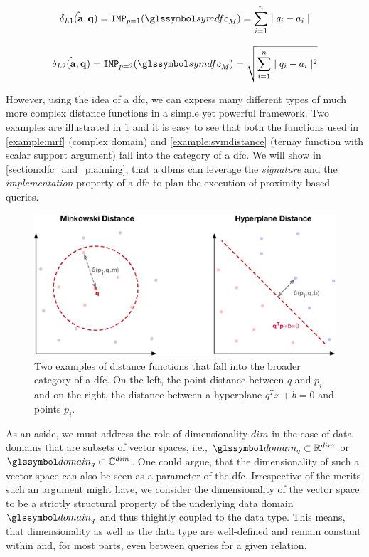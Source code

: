 \begin{equation}
    \hat{\delta_{L1}(\mathbf{a},\mathbf{q})} = \texttt{IMP}_{p=1}(\symdfc_M) = \sum_{i=1}^{n} \mid q_i - a_i \mid
\end{equation}

\begin{equation}
    \hat{\delta_{L2}(\mathbf{a},\mathbf{q})} = \texttt{IMP}_{p=2}(\symdfc_M) = \sqrt{\sum_{i=1}^{n} \mid q_i - a_i \mid^2}
\end{equation}

However, using the idea of a \acrshort{dfc}, we can express many different types of much more complex distance functions in a simple yet powerful framework. Two examples are illustrated in \cref{figure:distance_computation} and it is easy to see that both the functions used in \cref{example:mrf} (complex domain) and \cref{example:svmdistance} (ternay function with scalar support argument) fall into the category of a \acrshort{dfc}. We will show in \cref{section:dfc_and_planning}, that a \acrshort{dbms} can leverage the \emph{signature} and the \emph{implementation} property of a \acrshort{dfc} to plan the execution of proximity based queries.

\begin{figure}[bt]
    \centering
    \includegraphics[width=\textwidth]{figures/distance_computations.eps}
    \caption{Two examples of distance functions that fall into the broader category of a \acrshort{dfc}. On the left, the point-distance between $q$ and $p_i$ and on the right, the distance between a hyperplane $q^Tx+b = 0$ and points $p_i$.}
    \label{figure:distance_computation}
\end{figure}

As an aside, we must address the role of dimensionality $dim$ in the case of data domains that are subsets of vector spaces, i.e.,  $\domain_q \subset \mathbb{R}^{dim}$ or $\domain_q \subset \mathbb{C}^{dim}$. One could argue, that the dimensionality of such a vector space can also be seen as a parameter of the \acrshort{dfc}. Irrespective of the merits such an argument might have, we consider the dimensionality of the vector space to be a strictly structural property of the underlying data domain $\domain_q$ and thus thightly coupled to the data type. This means, that dimensionality as well as the data type are well-defined and remain constant within and, for most parts, even between queries for a given relation.

